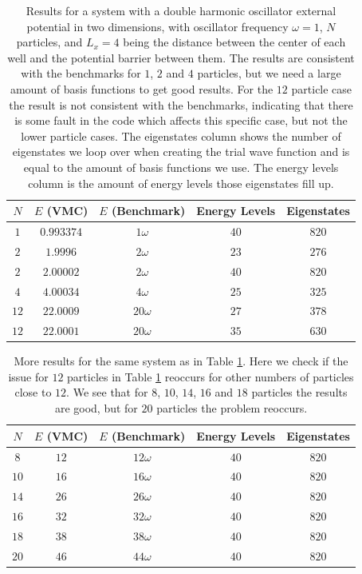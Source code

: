 \documentclass[../main.tex]{subfiles}
\begin{document}
\begin{table}[!ht]
  \centering
  \begin{tabular}{ | c | c | c | c | c | }
    \hline
    $N$ & $E$ (VMC) & $E$ (Benchmark) &  Energy Levels & Eigenstates\\*
    \hline
    $1$ & $0.993374$ & $1\omega$ & $40$ & $820$ \\*
    \hline
    $2$ & $1.9996$ & $2\omega$ & $23$ & $276$ \\*
    \hline
    $2$ & $2.00002$ & $2\omega$ & $40$ & $820$ \\*
    \hline
    $4$ & $4.00034$ & $4\omega$ & $25$ & $325$ \\*
    \hline
    $12$ & $22.0009$ & $20\omega$ & $27$ & $378$ \\*
    \hline
    $12$ & $22.0001$ & $20\omega$ & $35$ & $630$ \\*
    \hline
  \end{tabular}
  \caption{Results for a system with a double harmonic oscillator external potential in two dimensions, with oscillator frequency $\omega = 1$, $N$ particles, and $L_x = 4$ being the distance between the center of each well and the potential barrier between them. The results are consistent with the benchmarks for $1$, $2$ and $4$ particles, but we need a large amount of basis functions to get good results. For the $12$ particle case the result is not consistent with the benchmarks, indicating that there is some fault in the code which affects this specific case, but not the lower particle cases. The eigenstates column shows the number of eigenstates we loop over when creating the trial wave function and is equal to the amount of basis functions we use. The energy levels column is the amount of energy levels those eigenstates fill up.}
  \label{tab:DoubleHOTest2D}
\end{table}

\begin{table}[!ht]
  \centering
  \begin{tabular}{ | c | c | c | c | c | }
    \hline
    $N$ & $E$ (VMC) & $E$ (Benchmark) &  Energy Levels & Eigenstates\\*
    \hline
    $8$ & $12$ & $12\omega$ & $40$ & $820$ \\*
    \hline
    $10$ & $16$ & $16\omega$ & $40$ & $820$ \\*
    \hline
    $14$ & $26$ & $26\omega$ & $40$ & $820$ \\*
    \hline
    $16$ & $32$ & $32\omega$ & $40$ & $820$ \\*
    \hline
    $18$ & $38$ & $38\omega$ & $40$ & $820$ \\*
    \hline
    $20$ & $46$ & $44\omega$ & $40$ & $820$ \\*
    \hline
  \end{tabular}
  \caption{More results for the same system as in Table \ref{tab:DoubleHOTest2D}. Here we check if the issue for $12$ particles in Table \ref{tab:DoubleHOTest2D} reoccurs for other numbers of particles close to $12$. We see that for $8$, $10$, $14$, $16$ and $18$ particles the results are good, but for $20$ particles the problem reoccurs.}
  \label{tab:DoubleHOTest2DExtended}
\end{table}
\end{document}
